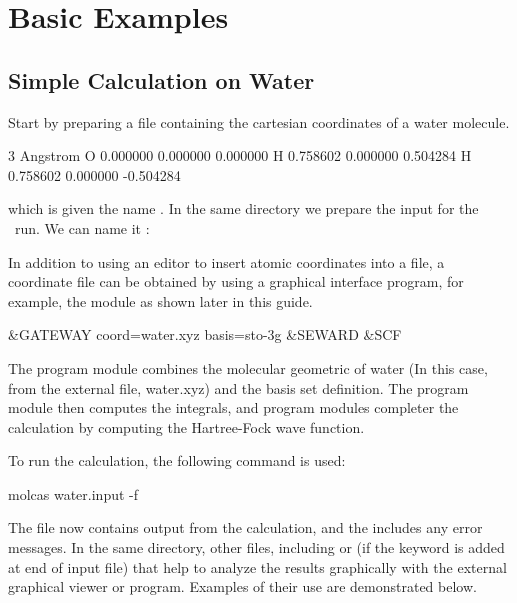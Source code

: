 \section{Basic Examples}

\subsection{Simple Calculation on Water}

Start by preparing a file containing the cartesian coordinates of a water molecule.

\begin{inputlisting}
 3
Angstrom
 O       0.000000  0.000000  0.000000
 H       0.758602  0.000000  0.504284
 H       0.758602  0.000000 -0.504284
\end{inputlisting}

which is given the name . In the same directory we prepare
the input for the \molcas\ run. We can name it :

In addition to using an editor to insert atomic coordinates into a file, a coordinate file can be obtained by using
a graphical interface program, for example, the  module as shown later in this guide.

\begin{inputlisting}
&GATEWAY
 coord=water.xyz
 basis=sto-3g
&SEWARD
&SCF
\end{inputlisting}

The  program module combines the molecular geometric of water
(In this case, from the external file, water.xyz) and the basis set definition.
The  program module then computes the integrals, and  program modules
completer the calculation by computing the Hartree-Fock wave function.

%

To run the calculation, the following command is used:

\begin{inputlisting}
molcas water.input -f
\end{inputlisting}

The file  now contains output from the calculation, and the 
includes any error messages. In the same directory, other files, including
 or  (if the keyword  is added at end of input file)
that help to analyze the results graphically with the external graphical viewer 
or  program. Examples of their use are demonstrated below.

